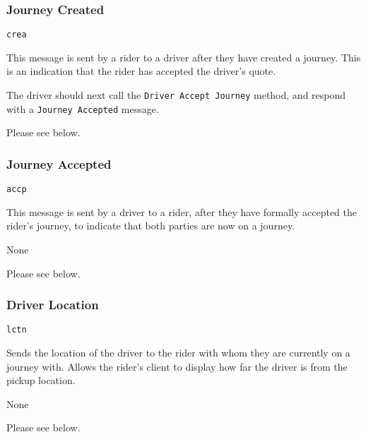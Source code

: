 \subsubsection{Journey Created}

\begin{description}[leftmargin=6em,style=nextline]
	\item [Topic]
		\lstinline{crea}
	\item [Purpose]
		This message is sent by a rider to a driver after they have created a journey. This is an indication that the rider has accepted the driver's quote.
	\item [Response]
		The driver should next call the \lstinline{Driver Accept Journey} method, and respond with a \lstinline{Journey Accepted} message.
	\item [Payload]
		Please see below.
\end{description}



\subsubsection{Journey Accepted}

\begin{description}[leftmargin=6em,style=nextline]
	\item [Topic]
		\lstinline{accp}
	\item [Purpose]
		This message is sent by a driver to a rider, after they have formally accepted the rider's journey, to indicate that both parties are now on a journey.
	\item [Response]
		None
	\item [Payload]
		Please see below.
\end{description}



\subsubsection{Driver Location}

\begin{description}[leftmargin=6em,style=nextline]
	\item [Topic]
		\lstinline{lctn}
	\item [Purpose]
		Sends the location of the driver to the rider with whom they are currently on a journey with. Allows the rider's client to display how far the driver is from the pickup location.
	\item [Response]
		None
	\item [Payload]
		Please see below.
\end{description}

